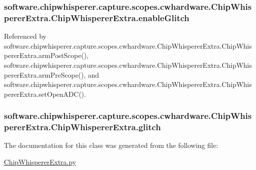 \subsubsection[{enable\+Glitch}]{\setlength{\rightskip}{0pt plus 5cm}software.\+chipwhisperer.\+capture.\+scopes.\+cwhardware.\+Chip\+Whisperer\+Extra.\+Chip\+Whisperer\+Extra.\+enable\+Glitch}\label{classsoftware_1_1chipwhisperer_1_1capture_1_1scopes_1_1cwhardware_1_1ChipWhispererExtra_1_1ChipWhispererExtra_a1188cd109054d98e8a7d82a6e13cb885}


Referenced by software.\+chipwhisperer.\+capture.\+scopes.\+cwhardware.\+Chip\+Whisperer\+Extra.\+Chip\+Whisperer\+Extra.\+arm\+Post\+Scope(), software.\+chipwhisperer.\+capture.\+scopes.\+cwhardware.\+Chip\+Whisperer\+Extra.\+Chip\+Whisperer\+Extra.\+arm\+Pre\+Scope(), and software.\+chipwhisperer.\+capture.\+scopes.\+cwhardware.\+Chip\+Whisperer\+Extra.\+Chip\+Whisperer\+Extra.\+set\+Open\+A\+D\+C().

\hypertarget{classsoftware_1_1chipwhisperer_1_1capture_1_1scopes_1_1cwhardware_1_1ChipWhispererExtra_1_1ChipWhispererExtra_ae6b55ce36d15d208dfaefc267d4def32}{}
\subsubsection[{glitch}]{\setlength{\rightskip}{0pt plus 5cm}software.\+chipwhisperer.\+capture.\+scopes.\+cwhardware.\+Chip\+Whisperer\+Extra.\+Chip\+Whisperer\+Extra.\+glitch}\label{classsoftware_1_1chipwhisperer_1_1capture_1_1scopes_1_1cwhardware_1_1ChipWhispererExtra_1_1ChipWhispererExtra_ae6b55ce36d15d208dfaefc267d4def32}


The documentation for this class was generated from the following file\+:\begin{DoxyCompactItemize}
\item 
\hyperlink{ChipWhispererExtra_8py}{Chip\+Whisperer\+Extra.\+py}\end{DoxyCompactItemize}
